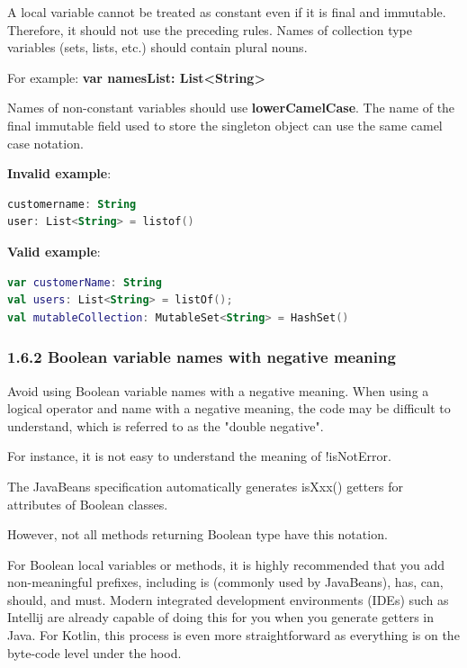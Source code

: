 {{{{{{{{A local variable cannot be treated as constant even if it is final and immutable. Therefore, it should not use the preceding rules. Names of collection type variables (sets, lists, etc.) should contain plural nouns.

For example: \textbf{var namesList: List<String>}



Names of non-constant variables should use \textbf{lowerCamelCase}. The name of the final immutable field used to store the singleton object can use the same camel case notation.



\textbf{Invalid example}: 

\begin{lstlisting}[language=Kotlin]
customername: String
user: List<String> = listof()
\end{lstlisting}


\textbf{Valid example}: 

\begin{lstlisting}[language=Kotlin]
var customerName: String
val users: List<String> = listOf();
val mutableCollection: MutableSet<String> = HashSet()
\end{lstlisting}


\subsubsection*{\textbf{1.6.2 Boolean variable names with negative meaning}}
\leavevmode\newline

\label{sec:1.6.2}



Avoid using Boolean variable names with a negative meaning. When using a logical operator and name with a negative meaning, the code may be difficult to understand, which is referred to as the "double negative".

For instance, it is not easy to understand the meaning of !isNotError.

The JavaBeans specification automatically generates isXxx() getters for attributes of Boolean classes.

However, not all methods returning Boolean type have this notation.

For Boolean local variables or methods, it is highly recommended that you add non-meaningful prefixes, including is (commonly used by JavaBeans), has, can, should, and must. Modern integrated development environments (IDEs) such as Intellij are already capable of doing this for you when you generate getters in Java. For Kotlin, this process is even more straightforward as everything is on the byte-code level under the hood.



}}}}}}}}

